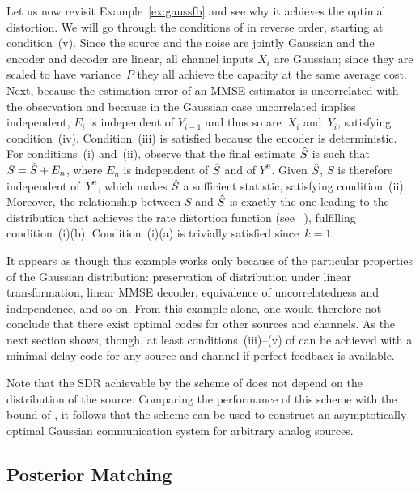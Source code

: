 Let us now revisit Example~\ref{ex:gaussfb} and see why it achieves the optimal
distortion. We will go through the conditions of 
in reverse order, starting at condition~(v). Since the source and the noise are
jointly Gaussian and the encoder and decoder are linear, all channel inputs
$X_i$ are Gaussian; since they are scaled to have variance~$P$ they all achieve
the capacity at the same average cost. Next, because the estimation error of an
MMSE estimator is uncorrelated with the observation and because in the Gaussian
case uncorrelated implies independent, $E_i$ is independent of $Y_{i-1}$ and
thus so are~$X_i$ and~$Y_i$, satisfying condition~(iv). Condition~(iii) is
satisfied because the encoder is deterministic. For conditions~(i) and~(ii),
observe that the final estimate ${\hat{S}}$ is such that $S = {\hat{S}} + E_n$, where $E_n$
is independent of ${\hat{S}}$ and of $Y^n$. Given ${\hat{S}}$, $S$ is therefore independent
of~$Y^n$, which makes ${\hat{S}}$ a sufficient statistic, satisfying condition~(ii).
Moreover, the relationship between $S$ and ${\hat{S}}$ is exactly the one leading to
the distribution that achieves the rate distortion function (see
\eg~\cite[Theorem~10.3.2]{CoverT1991}), fulfilling condition~(i)(b).
Condition~(i)(a) is trivially satisfied since~$k=1$.

It appears as though this example works only because of the particular
properties of the Gaussian distribution: preservation of distribution under
linear transformation, linear MMSE decoder, equivalence of uncorrelatedness and
independence, and so on. From this example alone, one would therefore not
conclude that there exist optimal codes for other sources and channels. As the
next section shows, though, at least conditions~(iii)--(v) of 
can be achieved with a minimal delay code for any source and channel if perfect
feedback is available.

\begin{remark}
  \label{rem:lmmse}
  Note that the SDR achievable by the scheme of  does not
  depend on the distribution of the source. Comparing the performance of this
  scheme with the bound of , it follows that the scheme can be
  used to construct an asymptotically optimal Gaussian communication system for
  arbitrary analog sources.
\end{remark}

\subsection{Posterior Matching}

